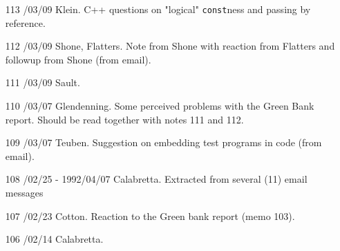 \begin{enumerate}
\item[113]
/03/09 Klein.
\linebreak  C++ questions on "logical" \texttt{const}ness and passing by reference.

\item[112]
/03/09 Shone, Flatters.
\linebreak  Note from Shone with reaction from Flatters and followup from Shone
   (from email).

\item[111]
/03/09 Sault.

\item[110]
/03/07 Glendenning.
\linebreak  Some perceived problems with the Green Bank report.  Should be read
   together with notes 111 and 112.

\item[109]
/03/07 Teuben.
\linebreak  Suggestion on embedding test programs in code (from email).

\item[108]
/02/25 - 1992/04/07 Calabretta.
\linebreak  Extracted from several (11) email messages

\item[107]
/02/23 Cotton.
\linebreak  Reaction to the Green bank report (memo 103).

\item[106]
/02/14 Calabretta.


\end{enumerate}
